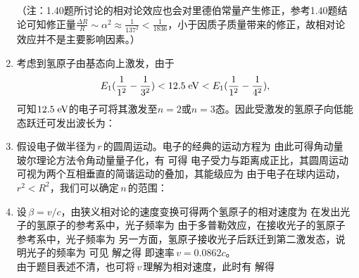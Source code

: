 \begin{enumerate}[label=1.\arabic*, leftmargin=-0.5mm]
（注：1.40题所讨论的相对论效应也会对里德伯常量产生修正，参考1.40题结论可知修正量$\frac{\Delta R}{R}\sim \alpha^2 
\approx\frac{1}{137^2}<\frac{1}{1836}$，小于因质子质量带来的修正，故相对论效应并不是主要影响因素。）

\item
考虑到氢原子由基态向上激发，由于
\[E_1(\frac{1}{1^2}-\frac{1}{3^2}) < 12.5\;\mathrm{eV} < E_1(\frac{1}{1^2}-\frac{1}{4^2}),\]
可知$12.5\;\mathrm{eV}$的电子可将其激发至$n=2$或$n=3$态。因此受激发的氢原子向低能态跃迁可发出波长为：

\item
假设电子做半径为$\,r\,$的圆周运动。电子的经典的运动方程为
由此可得角动量
玻尔理论方法令角动量量子化，有
可得
电子受力与距离成正比，其圆周运动可视为两个互相垂直的简谐运动的叠加，其能级应为
由于电子在球内运动，$r^2<R^2$，我们可以确定$\,n\,$的范围：

\item
设$\,\beta=v/c$，由狭义相对论的速度变换可得两个氢原子的相对速度为
在发出光子的氢原子的参考系中，光子频率为
由于多普勒效应，在接收光子的氢原子参考系中，光子频率为
另一方面，氢原子接收光子后跃迁到第二激发态，说明光子的频率为
可见
解之得
即速率$\,v=0.0862c$。\\
由于题目表述不清，也可将$\,v\,$理解为相对速度，此时有
解得


\end{enumerate}

